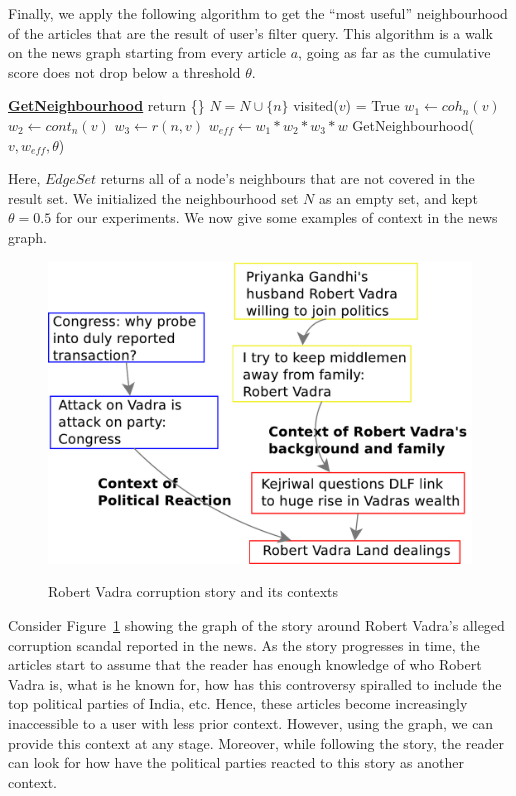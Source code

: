 Finally, we apply the following algorithm to get the ``most useful'' neighbourhood of the articles that are the result of user's filter query. This algorithm is a walk on the news graph starting from every article $a$, 
going as far as the cumulative score does not drop below a threshold $\theta$.

\begin{algorithmic}
  \State \textbf{\underline{GetNeighbourhood}}
  \State {}
  \State {}
      \State return \{\}
    \EndIf
    \State $N = N\cup\{n\}$
        \State visited($v$) = True
        \State $w_1 \leftarrow coh_{n}(v)$
        \State $w_2 \leftarrow cont_{n}(v)$
        \State $w_3 \leftarrow r(n,v)$
        \State $w_{eff} \leftarrow w_1 * w_2 * w_3 * w$
        \State GetNeighbourhood($v, w_{eff}, \theta$)
      \EndIf
    \EndFor
\end{algorithmic}

Here, $EdgeSet$ returns all of a node's neighbours that are not covered in the result set. We initialized the neighbourhood set $N$ as an empty
set, and kept $\theta=0.5$ for our experiments.  We now give some examples of context in the news graph.

\begin{figure}
\caption{Robert Vadra corruption story and its contexts}
\includegraphics[scale=0.36]{figures/graph-vadra.pdf}
\label{fig:vadra-corruption}
\end{figure}

Consider Figure~\ref{fig:vadra-corruption} showing the graph of the story around Robert Vadra's alleged
corruption scandal reported in the news. As the story progresses in time, the articles
start to assume that the reader has enough knowledge of who Robert Vadra is, what is he known for,
how has this controversy spiralled to include the top political parties of India, etc. Hence, these articles
become increasingly inaccessible to a user with less prior context. However, 
using the graph, we can provide this context at any stage. Moreover, while following the story, 
the reader can look for how have the political parties reacted to this story as another context.

